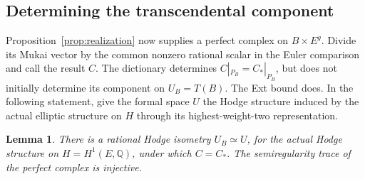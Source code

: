 \documentclass[11pt]{article}
\numberwithin{equation}{section}
\newtheorem{lemma}[theorem]{Lemma}
\theoremstyle{definition}
\theoremstyle{remark}
\begin{document}
\subsection{Determining the transcendental component}
\label{ks:exactness-section}

Proposition~\ref{prop:realization} now supplies a perfect
complex on $B\times E^g$.  Divide its Mukai vector by the
common nonzero rational scalar in the Euler comparison and
call the result $C$.  The dictionary determines
$C|_{P_B}=C_*|_{P_B}$, but does not initially determine
its component on $U_B=T(B)$.  The Ext bound does.  In the
following statement, give the formal space $U$ the Hodge
structure induced by the actual elliptic structure on $H$
through its highest-weight-two representation.

\begin{lemma}
 \label{ks:exactness}
There is a rational Hodge isometry $U_B\simeq U$, for the
actual Hodge structure on $H=H^1(E,\mathbb Q)$, under which
$C=C_*$.  The semiregularity trace of the perfect complex
is injective.
\end{lemma}
\end{document}
